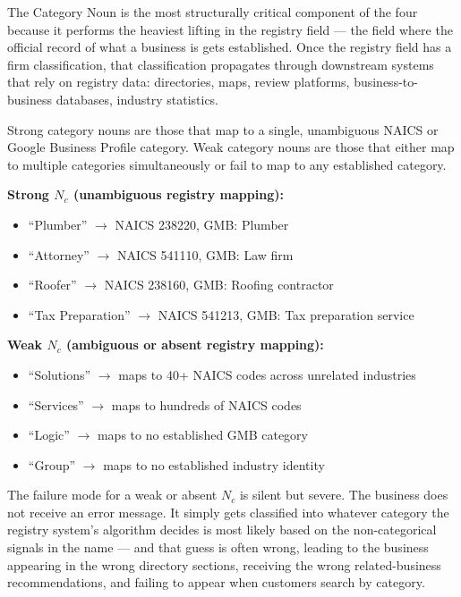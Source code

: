 \documentclass[12pt, openany]{book}
\theoremstyle{thmstyle}
\theoremstyle{defstyle}
\newcommand{\Nc}{N_c}
\begin{document}
The Category Noun is the most structurally critical component of the four because it performs the heaviest lifting in the registry field --- the field where the official record of what a business is gets established. Once the registry field has a firm classification, that classification propagates through downstream systems that rely on registry data: directories, maps, review platforms, business-to-business databases, industry statistics.

Strong category nouns are those that map to a single, unambiguous NAICS or Google Business Profile category. Weak category nouns are those that either map to multiple categories simultaneously or fail to map to any established category.

\begin{examplebox}
\textbf{Strong $\Nc$ (unambiguous registry mapping):}
\begin{itemize}[leftmargin=1.5em]
  \item ``Plumber'' $\rightarrow$ NAICS 238220, GMB: Plumber
  \item ``Attorney'' $\rightarrow$ NAICS 541110, GMB: Law firm
  \item ``Roofer'' $\rightarrow$ NAICS 238160, GMB: Roofing contractor
  \item ``Tax Preparation'' $\rightarrow$ NAICS 541213, GMB: Tax preparation service
\end{itemize}

\textbf{Weak $\Nc$ (ambiguous or absent registry mapping):}
\begin{itemize}[leftmargin=1.5em]
  \item ``Solutions'' $\rightarrow$ maps to 40+ NAICS codes across unrelated industries
  \item ``Services'' $\rightarrow$ maps to hundreds of NAICS codes
  \item ``Logic'' $\rightarrow$ maps to no established GMB category
  \item ``Group'' $\rightarrow$ maps to no established industry identity
\end{itemize}
\end{examplebox}

The failure mode for a weak or absent $\Nc$ is silent but severe. The business does not receive an error message. It simply gets classified into whatever category the registry system's algorithm decides is most likely based on the non-categorical signals in the name --- and that guess is often wrong, leading to the business appearing in the wrong directory sections, receiving the wrong related-business recommendations, and failing to appear when customers search by category.
\end{document}

